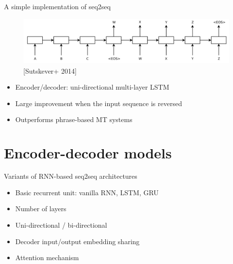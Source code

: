 \documentclass[usenames,dvipsnames,notes]{beamer}
\begin{document}
\begin{frame}
    {A simple implementation of seq2seq}
    \begin{figure}
        \includegraphics[height=2.5cm]{figures/s2s-ilya}
        \caption{[Sutskever+ 2014]}
    \end{figure}
    \begin{itemize}
        \item Encoder/decoder: uni-directional multi-layer LSTM
        \item Large improvement when the input sequence is reversed
        \item Outperforms phrase-based MT systems 
    \end{itemize}
\end{frame}

\section{Encoder-decoder models}

\begin{frame}
    {Variants of RNN-based seq2seq architectures}
    \begin{itemize}
        \item Basic recurrent unit: vanilla RNN, LSTM, GRU
        \item Number of layers
        \item Uni-directional / bi-directional
        \item Decoder input/output embedding sharing
        \item Attention mechanism
    \end{itemize}
\end{frame}
\end{document}
